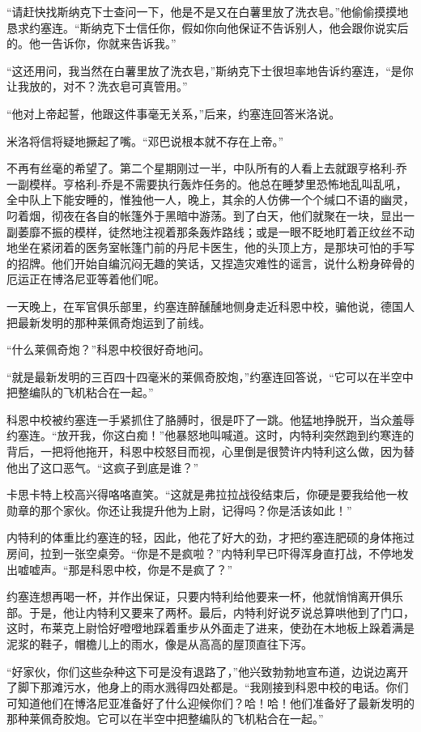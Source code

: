     “请赶快找斯纳克下士查问一下，他是不是又在白薯里放了洗衣皂。”他偷偷摸摸地恳求约塞连。“斯纳克下士信任你，假如你向他保证不告诉别人，他会跟你说实后的。他一告诉你，你就来告诉我。”

    “这还用问，我当然在白薯里放了洗衣皂，”斯纳克下士很坦率地告诉约塞连，“是你让我放的，对不？洗衣皂可真管用。”

    “他对上帝起誓，他跟这件事毫无关系，”后来，约塞连回答米洛说。

    米洛将信将疑地撅起了嘴。“邓巴说根本就不存在上帝。”

    不再有丝毫的希望了。第二个星期刚过一半，中队所有的人看上去就跟亨格利-乔一副模样。亨格利-乔是不需要执行轰炸任务的。他总在睡梦里恐怖地乱叫乱吼，全中队上下能安睡的，惟独他一人，晚上，其余的人仿佛一个个缄口不语的幽灵，叼着烟，彻夜在各自的帐篷外于黑暗中游荡。到了白天，他们就聚在一块，显出一副萎靡不振的模样，徒然地注视着那条轰炸路线；或是一眼不眨地盯着正纹丝不动地坐在紧闭着的医务室帐篷门前的丹尼卡医生，他的头顶上方，是那块可怕的手写的招牌。他们开始自编沉闷无趣的笑话，又捏造灾难性的谣言，说什么粉身碎骨的厄运正在博洛尼亚等着他们呢。

    一天晚上，在军官俱乐部里，约塞连醉醺醺地侧身走近科恩中校，骗他说，德国人把最新发明的那种莱佩奇炮运到了前线。

    “什么莱佩奇炮？”科恩中校很好奇地问。

    “就是最新发明的三百四十四毫米的莱佩奇胶炮，”约塞连回答说，“它可以在半空中把整编队的飞机粘合在一起。”

    科恩中校被约塞连一手紧抓住了胳膊时，很是吓了一跳。他猛地挣脱开，当众羞辱约塞连。“放开我，你这白痴！”他暴怒地叫喊道。这时，内特利突然跑到约寒连的背后，一把将他拖开，科恩中校怒目而视，心里倒是很赞许内特利这么做，因为替他出了这口恶气。“这疯子到底是谁？”
 


    卡思卡特上校高兴得咯咯直笑。“这就是弗拉拉战役结束后，你硬是要我给他一枚勋章的那个家伙。你还让我提升他为上尉，记得吗？你是活该如此！”

    内特利的体重比约塞连的轻，因此，他花了好大的劲，才把约塞连肥硕的身体拖过房间，拉到一张空桌旁。“你是不是疯啦？”内特利早已吓得浑身直打战，不停地发出嘘嘘声。“那是科恩中校，你是不是疯了？”

    约塞连想再喝一杯，并作出保证，只要内特利给他要来一杯，他就悄悄离开俱乐部。于是，他让内特利又要来了两杯。最后，内特利好说歹说总算哄他到了门口，这时，布莱克上尉恰好噔噔地踩着重步从外面走了进来，使劲在木地板上跺着满是泥浆的鞋子，帽檐儿上的雨水，像是从高高的屋顶直往下泻。

    “好家伙，你们这些杂种这下可是没有退路了，”他兴致勃勃地宣布道，边说边离开了脚下那滩污水，他身上的雨水溅得四处都是。“我刚接到科恩中校的电话。你们可知道他们在博洛尼亚准备好了什么迎候你们？哈！哈！他们准备好了最新发明的那种莱佩奇胶炮。它可以在半空中把整编队的飞机粘合在一起。”


